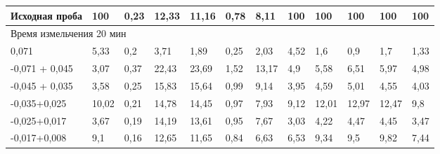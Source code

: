 {\begin{longtable}[c]{|p{}lllllllllll|}
\multicolumn{1}{|l|}{Исходная проба} & \multicolumn{1}{l|}{100} & \multicolumn{1}{l|}{0,23} & \multicolumn{1}{l|}{12,33} & \multicolumn{1}{l|}{11,16} & \multicolumn{1}{l|}{0,78} & \multicolumn{1}{l|}{8,11} & \multicolumn{1}{l|}{100} & \multicolumn{1}{l|}{100} & \multicolumn{1}{l|}{100} & \multicolumn{1}{l|}{100} & 100 \\ \hline
\multicolumn{12}{|l|}{Время измельчения 20 мин} \\ \hline
\multicolumn{1}{|l|}{0,071} & \multicolumn{1}{l|}{5,33} & \multicolumn{1}{l|}{0,2} & \multicolumn{1}{l|}{3,71} & \multicolumn{1}{l|}{1,89} & \multicolumn{1}{l|}{0,25} & \multicolumn{1}{l|}{2,03} & \multicolumn{1}{l|}{4,52} & \multicolumn{1}{l|}{1,6} & \multicolumn{1}{l|}{0,9} & \multicolumn{1}{l|}{1,7} & 1,33 \\ \hline
\multicolumn{1}{|l|}{-0,071 + 0,045} & \multicolumn{1}{l|}{3,07} & \multicolumn{1}{l|}{0,37} & \multicolumn{1}{l|}{22,43} & \multicolumn{1}{l|}{23,69} & \multicolumn{1}{l|}{1,52} & \multicolumn{1}{l|}{13,17} & \multicolumn{1}{l|}{4,9} & \multicolumn{1}{l|}{5,58} & \multicolumn{1}{l|}{6,51} & \multicolumn{1}{l|}{5,97} & 4,98 \\ \hline
\multicolumn{1}{|l|}{-0,045 + 0,035} & \multicolumn{1}{l|}{3,58} & \multicolumn{1}{l|}{0,25} & \multicolumn{1}{l|}{15,83} & \multicolumn{1}{l|}{15,64} & \multicolumn{1}{l|}{0,99} & \multicolumn{1}{l|}{9,14} & \multicolumn{1}{l|}{3,95} & \multicolumn{1}{l|}{4,59} & \multicolumn{1}{l|}{5,01} & \multicolumn{1}{l|}{4,55} & 4,03 \\ \hline
\multicolumn{1}{|l|}{-0,035+0,025} & \multicolumn{1}{l|}{10,02} & \multicolumn{1}{l|}{0,21} & \multicolumn{1}{l|}{14,78} & \multicolumn{1}{l|}{14,45} & \multicolumn{1}{l|}{0,97} & \multicolumn{1}{l|}{7,93} & \multicolumn{1}{l|}{9,12} & \multicolumn{1}{l|}{12,01} & \multicolumn{1}{l|}{12,97} & \multicolumn{1}{l|}{12,47} & 9,8 \\ \hline
\multicolumn{1}{|l|}{-0,025+0,017} & \multicolumn{1}{l|}{3,67} & \multicolumn{1}{l|}{0,19} & \multicolumn{1}{l|}{14,19} & \multicolumn{1}{l|}{13,61} & \multicolumn{1}{l|}{0,95} & \multicolumn{1}{l|}{7,67} & \multicolumn{1}{l|}{3,03} & \multicolumn{1}{l|}{4,22} & \multicolumn{1}{l|}{4,47} & \multicolumn{1}{l|}{4,45} & 3,47 \\ \hline
\multicolumn{1}{|l|}{-0,017+0,008} & \multicolumn{1}{l|}{9,1} & \multicolumn{1}{l|}{0,16} & \multicolumn{1}{l|}{12,65} & \multicolumn{1}{l|}{11,65} & \multicolumn{1}{l|}{0,84} & \multicolumn{1}{l|}{6,63} & \multicolumn{1}{l|}{6,53} & \multicolumn{1}{l|}{9,34} & \multicolumn{1}{l|}{9,5} & \multicolumn{1}{l|}{9,82} & 7,44 \\ \hline

\end{longtable}}
